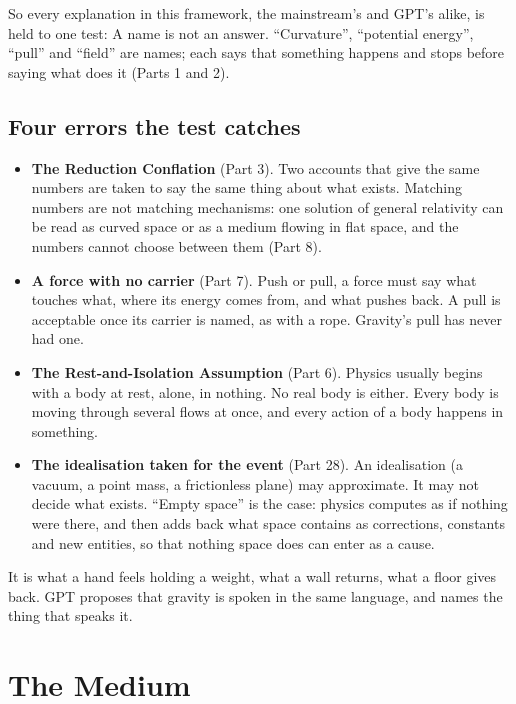 \documentclass[11pt,a4paper]{article}
\begin{document}
So every explanation in this framework, the mainstream's and GPT's alike, is held to one test:  A name is not an answer. ``Curvature'', ``potential energy'', ``pull'' and ``field'' are names; each says that something happens and stops before saying what does it (Parts 1 and 2).

\subsection{Four errors the test catches}

\begin{itemize}
\item \textbf{The Reduction Conflation} (Part 3). Two accounts that give the same numbers are taken to say the same thing about what exists. Matching numbers are not matching mechanisms: one solution of general relativity can be read as curved space or as a medium flowing in flat space, and the numbers cannot choose between them (Part 8).
\item \textbf{A force with no carrier} (Part 7). Push or pull, a force must say what touches what, where its energy comes from, and what pushes back. A pull is acceptable once its carrier is named, as with a rope. Gravity's pull has never had one.
\item \textbf{The Rest-and-Isolation Assumption} (Part 6). Physics usually begins with a body at rest, alone, in nothing. No real body is either. Every body is moving through several flows at once, and every action of a body happens in something.
\item \textbf{The idealisation taken for the event} (Part 28). An idealisation (a vacuum, a point mass, a frictionless plane) may approximate. It may not decide what exists. ``Empty space'' is the case: physics computes as if nothing were there, and then adds back what space contains as corrections, constants and new entities, so that nothing space does can enter as a cause.
\end{itemize}

 It is what a hand feels holding a weight, what a wall returns, what a floor gives back. GPT proposes that gravity is spoken in the same language, and names the thing that speaks it.

\section{The Medium}
\end{document}
